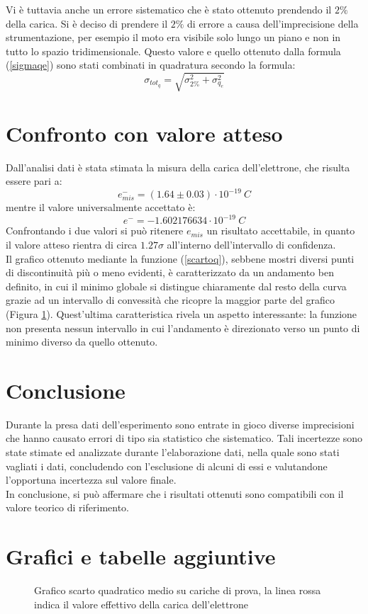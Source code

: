 \documentclass{article}
\begin{document}
Vi è tuttavia anche un errore sistematico che è stato ottenuto prendendo il $2\%$ della carica. Si è deciso di prendere il $2\%$ di errore a causa dell'imprecisione della strumentazione, per esempio il moto era visibile solo lungo un piano e non in tutto lo spazio tridimensionale. Questo valore e quello ottenuto dalla formula (\ref{sigmaqe}) sono stati combinati in quadratura secondo la formula:
\begin{equation}
	\sigma_{tot_q}=\sqrt{\sigma_{2\%}^2+\sigma_{q_e}^2}
\end{equation}

\section{Confronto con valore atteso}
Dall'analisi dati è stata stimata la misura della carica dell'elettrone, che risulta essere pari a: \[e^{-}_{mis}=(1.64 \pm 0.03)\cdot 10^{-19} \ C\] mentre il valore universalmente accettato è: \[e^{-} = -1.602176634 \cdot 10^{-19} \ C\]
Confrontando i due valori si può ritenere \textit{$e_{mis}$} un risultato accettabile, in quanto il valore atteso rientra di circa $1.27\sigma$  all'interno dell'intervallo di confidenza.\\
Il grafico ottenuto mediante la funzione (\ref{scartoq}), sebbene mostri diversi punti di discontinuità più o meno evidenti, è caratterizzato da un andamento ben definito, in cui il minimo globale si distingue chiaramente dal resto della curva grazie ad un intervallo di convessità che ricopre la maggior parte del grafico (Figura \ref{Grafico}). Quest’ultima caratteristica rivela un aspetto interessante: la funzione non presenta nessun intervallo in cui l’andamento è direzionato verso un punto di minimo diverso da quello ottenuto.

\section{Conclusione}
Durante la presa dati dell'esperimento sono entrate in gioco diverse imprecisioni che hanno causato errori di tipo sia statistico che sistematico. Tali incertezze sono state stimate ed analizzate durante l'elaborazione dati, nella quale sono stati vagliati i dati, concludendo con l'esclusione di alcuni di essi e valutandone l'opportuna incertezza sul valore finale.\\
In conclusione, si può affermare che i risultati ottenuti sono compatibili con il valore teorico di riferimento.

\section{Grafici e tabelle aggiuntive}
\begin{figure}[H]
	\center
	
	\caption{Grafico scarto quadratico medio su cariche di prova, la linea rossa indica il valore effettivo della carica dell'elettrone}
	\label{Grafico}
\end{figure}
\end{document}
